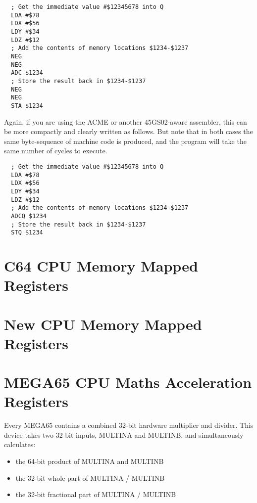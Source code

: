 \begin{tcolorbox}[colback=black,coltext=white]
\verbatimfont{\codefont}
\begin{verbatim}
  ; Get the immediate value #$12345678 into Q
  LDA #$78
  LDX #$56
  LDY #$34
  LDZ #$12
  ; Add the contents of memory locations $1234-$1237
  NEG
  NEG
  ADC $1234
  ; Store the result back in $1234-$1237
  NEG
  NEG
  STA $1234
\end{verbatim}
\end{tcolorbox}

Again, if you are using the ACME or another 45GS02-aware assembler, this can be more compactly and
clearly written as follows. But note that in both cases the same byte-sequence of machine code is
produced, and the program will take the same number of cycles to execute.

\begin{tcolorbox}[colback=black,coltext=white]
\verbatimfont{\codefont}
\begin{verbatim}
  ; Get the immediate value #$12345678 into Q
  LDA #$78
  LDX #$56
  LDY #$34
  LDZ #$12
  ; Add the contents of memory locations $1234-$1237
  ADCQ $1234
  ; Store the result back in $1234-$1237
  STQ $1234
\end{verbatim}
\end{tcolorbox}


\section{C64 CPU Memory Mapped Registers}



\section{New CPU Memory Mapped Registers}



\section{MEGA65 CPU Maths Acceleration Registers}

Every MEGA65 contains a combined 32-bit hardware multiplier and divider.
This device takes two 32-bit inputs, MULTINA and MULTINB, and simultaneously calculates:

\begin{itemize}
\item the 64-bit product of MULTINA and MULTINB
\item the 32-bit whole part of MULTINA / MULTINB
\item the 32-bit fractional part of MULTINA / MULTINB
\end{itemize}

